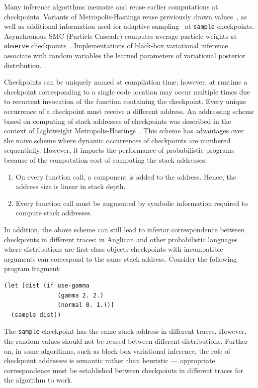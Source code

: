 \documentclass[preprint]{sigplanconf}
\begin{document}
Many inference algorithms memoize and reuse earlier computations
at checkpoints. Variants of Metropolis-Hastings reuse previously
drawn values~\cite{WSG11}, as well as additional information
used for adaptive sampling~\cite{TMP+15} at \texttt{sample}
checkpoints. Asynchronous SMC (Particle Cascade) computes
average particle weights at \texttt{observe}
checkpoints~\cite{PWD+14}. Implementations of black-box
variational inference~\cite{WW13,MPT+16} associate with random
variables the learned parameters of variational posterior
distribution.

Checkpoints can be uniquely named at compilation time;
however, at runtime a checkpoint corresponding to a single code
location may occur multiple times due to recurrent invocation of
the function containing the checkpoint. Every unique occurrence
of a checkpoint must receive a different address. An addressing
scheme based on computing of stack addresses of checkpoints was
described in the context of Lightweight
Metropolis-Hastings~\cite{WSG11}.  This scheme has advantages
over the naive scheme where dynamic occurrences of checkpoints
are numbered sequentially. However, it impacts the
performance of probabilistic programs because of the computation
cost of computing the stack addresses:
\begin{enumerate}
    \item On every function call, a component is added to the
        address. Hence, the address size is linear in stack depth.
    \item Every function call must be augmented by symbolic
        information required to compute stack addresses.
\end{enumerate}
In addition, the above scheme can still lead to inferior
correspondence between checkpoints in different traces: in
Anglican and other probabilistic languages where distributions
are first-class objects checkpoints with incompatible arguments
can correspond to the same stack address. Consider the following
program fragment:
\begin{lstlisting}[style=default]
(let [dist (if use-gamma
               (gamma 2. 2.)
               (normal 0. 1.))]
  (sample dist))
\end{lstlisting}
The \texttt{sample} checkpoint has the same stack address in
different traces. However, the random values should not be
reused between different distributions. Further on, in some
algorithms, such as black-box variational inference, the role of
checkpoint addresses is semantic rather than heuristic ---
appropriate correspondence must be established
between checkpoints in different traces for the algorithm to
work.
\end{document}
